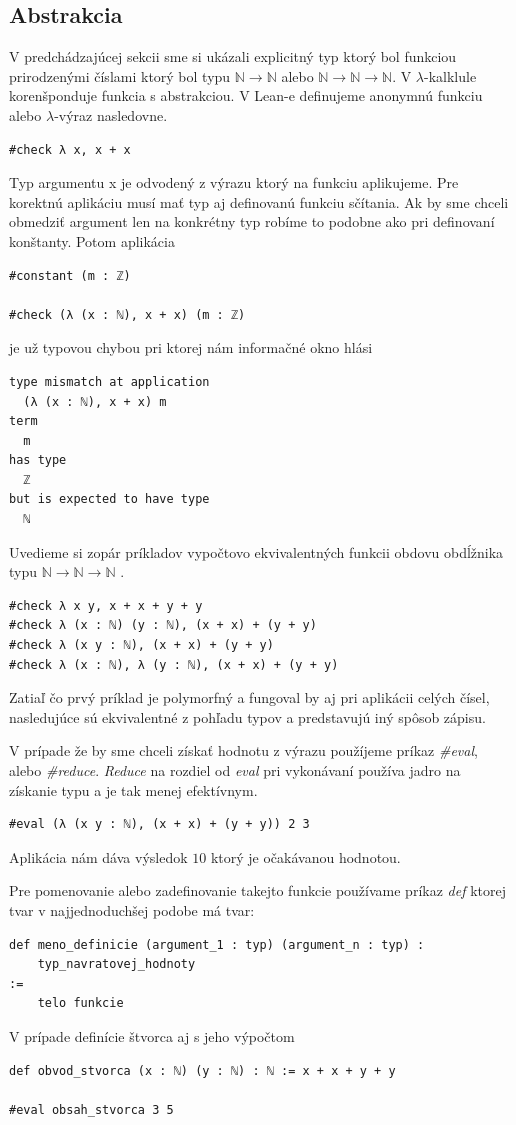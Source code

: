 \documentclass[a4paper,10pt,oneside]{report}%
\begin{document}
\subsection{Abstrakcia}
    V predchádzajúcej sekcii sme si ukázali explicitný typ ktorý bol funkciou prirodzenými
číslami ktorý bol typu $\mathbb{N} \to \mathbb{N}$ alebo $\mathbb{N} \to \mathbb{N} \to \mathbb{N}$.
    V $\lambda$-kalklule korenšponduje funkcia s abstrakciou. V Lean-e definujeme
anonymnú funkciu alebo $\lambda$-výraz nasledovne.
\begin{lstlisting}
#check λ x, x + x
\end{lstlisting}
    Typ argumentu x je odvodený z výrazu ktorý na funkciu aplikujeme.
    Pre korektnú aplikáciu musí mať typ aj definovanú funkciu sčítania.
    Ak by sme chceli obmedziť argument len na konkrétny typ robíme to podobne ako
pri definovaní konštanty. Potom aplikácia
\begin{lstlisting}
#constant (m : ℤ)

#check (λ (x : ℕ), x + x) (m : ℤ)
\end{lstlisting}
je už typovou chybou pri ktorej nám informačné okno hlási
\begin{lstlisting}
type mismatch at application
  (λ (x : ℕ), x + x) m
term
  m
has type
  ℤ
but is expected to have type
  ℕ
\end{lstlisting}
    Uvedieme si zopár príkladov vypočtovo ekvivalentných funkcii obdovu obdĺžnika typu
$\mathbb{N} \to \mathbb{N} \to \mathbb{N}$
.
\begin{lstlisting}
#check λ x y, x + x + y + y
#check λ (x : ℕ) (y : ℕ), (x + x) + (y + y)
#check λ (x y : ℕ), (x + x) + (y + y)
#check λ (x : ℕ), λ (y : ℕ), (x + x) + (y + y)
\end{lstlisting}
    Zatiaľ čo prvý príklad je polymorfný a fungoval by aj pri aplikácii celých čísel,
nasledujúce sú ekvivalentné z pohľadu typov a predstavujú iný spôsob zápisu.

    V prípade že by sme chceli získať hodnotu z výrazu použíjeme príkaz \emph{\#eval},
alebo \emph{\#reduce}. \emph{Reduce} na rozdiel od \emph{eval} pri vykonávaní používa
jadro na získanie typu a je tak menej efektívnym.
\begin{lstlisting}
#eval (λ (x y : ℕ), (x + x) + (y + y)) 2 3
\end{lstlisting}
    Aplikácia nám dáva výsledok $10$ ktorý je očakávanou hodnotou.

    Pre pomenovanie alebo zadefinovanie takejto funkcie používame príkaz \emph{def}
ktorej tvar v najjednoduchšej podobe má tvar:
\begin{lstlisting}
def meno_definicie (argument_1 : typ) (argument_n : typ) :
    typ_navratovej_hodnoty 
:=
    telo funkcie
\end{lstlisting}
V prípade definície štvorca aj s jeho výpočtom
\begin{lstlisting}
def obvod_stvorca (x : ℕ) (y : ℕ) : ℕ := x + x + y + y

#eval obsah_stvorca 3 5
\end{lstlisting}
\end{document}
